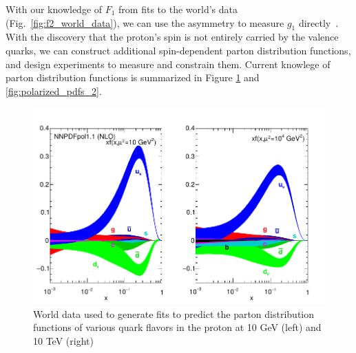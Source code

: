 {\noindent}With our knowledge of $F_1$ from fits to the world's data
(Fig.~\ref{fig:f2_world_data}), we can use the asymmetry to measure $g_1$
directly~\cite{DeFlorian2009}. With the discovery that the proton's spin is not
entirely carried by the valence quarks, we can construct additional
spin-dependent parton distribution functions, and design experiments to measure
and constrain them. Current knowlege of parton distribution functions is
summarized in Figure \ref{fig:polarized_pdfs_1} and \ref{fig:polarized_pdfs_2}.

\begin{figure}[ht]
  \centering
  \includegraphics[width=0.7\linewidth]{./figures/polarized_pdfs.pdf}
  \caption{
    World data used to generate fits to predict the parton distribution
    functions of various quark flavors in the proton at 10 GeV (left) and 10
    TeV (right)~\cite{ReviewEidelman2012}
  }
  \label{fig:polarized_pdfs_1}
\end{figure}

